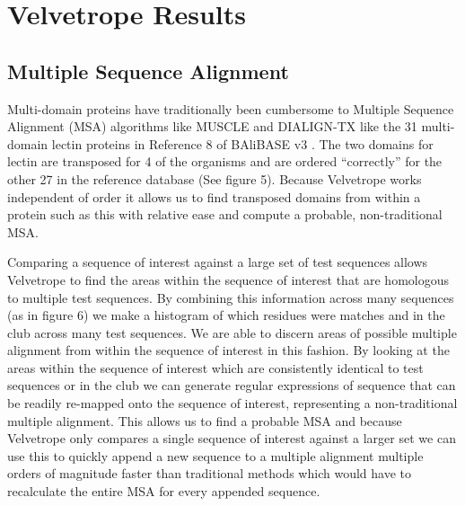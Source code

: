 \documentclass[phd,tocprelim]{cornell}
\renewcommand{\caption}[1]{\singlespacing\hangcaption{#1}\normalspacing}
\begin{document}


\chapter{Velvetrope Results} %
\label{cha:Velvetrope Results}

\section{Multiple Sequence Alignment}

Multi-domain proteins have traditionally been cumbersome to Multiple Sequence Alignment (MSA) algorithms like MUSCLE \cite{MUSCLE} and DIALIGN-TX \cite{DIALIGN-TX} like the 31 multi-domain lectin proteins in Reference 8 of BAliBASE v3 \cite{Balibase}. The two domains for lectin are transposed for 4 of the organisms and are ordered ``correctly'' for the other 27 in the reference database (See figure 5). Because Velvetrope works independent of order it allows us to find transposed domains from within a protein such as this with relative ease and compute a probable, non-traditional MSA.

Comparing a sequence of interest against a large set of test sequences allows Velvetrope to find the areas within the sequence of interest that are homologous to multiple test sequences. By combining this information across many sequences (as in figure 6) we make a histogram of which residues were matches and in the club across many test sequences. We are able to discern areas of possible multiple alignment from within the sequence of interest in this fashion. By looking at the areas within the sequence of interest which are consistently identical to test sequences or in the club we can generate regular expressions of sequence that can be readily re-mapped onto the sequence of interest, representing a non-traditional multiple alignment.  This allows us to find a probable MSA and because Velvetrope only compares a single sequence of interest against a larger set we can use this to quickly append a new sequence to a multiple alignment multiple orders of magnitude faster than traditional methods which would have to recalculate the entire MSA for every appended sequence.
\end{document}
